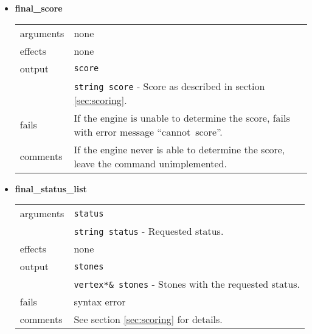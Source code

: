 \documentclass[a4paper]{article}
\begin{document}
\begin{itemize}
\item \textbf{final\_score} \\
  \begin{tabularx}{\linewidth}{lX}
    arguments &  none \\
    effects &    none \\
    output &     \texttt{score}\\
    & \texttt{string score} - Score as described in section
                              \ref{sec:scoring}. \\
    fails &      If the engine is unable to determine the score, fails
                 with error message ``cannot~score''. \\
    comments &   If the engine never is able to determine the score,
                 leave the command unimplemented.
  \end{tabularx}


\item \textbf{final\_status\_list} \\
  \begin{tabularx}{\linewidth}{lX}
    arguments &  \texttt{status} \\
    & \texttt{string status} - Requested status. \\
    effects &    none \\
    output &     \texttt{stones} \\
    & \texttt{vertex*\& stones} - Stones with the requested status. \\
    fails &      syntax error \\
    comments &   See section \ref{sec:scoring} for details. \\
  \end{tabularx}
\end{itemize}
\end{document}
